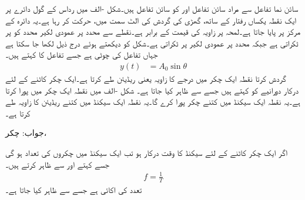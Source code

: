 
سائن نما تفاعل سے مراد سائن تفاعل  اور کو سائن تفاعل  ہیں۔شکل -الف میں رداس  کے گول دائرے پر ایک نقطہ یکساں رفتار کے ساتھ، گھڑی کی گردش کی الٹ سمت میں، حرکت کر رہا ہے۔یہ دائرہ  کے مرکز  پر پایا جاتا ہے۔لمحہ  پر زاویہ  کی قیمت  کے برابر ہے۔نقطے سے  محدد پر عمودی لکیر محدد کو    پر ٹکراتی ہے جبکہ  محدد پر عمودی لکیر  پر ٹکراتی ہے۔شکل کو دیکھتے ہوئے درج ذیل لکھا جا سکتا ہے جہاں  تفاعل کی چوٹی ہے جسے تفاعل کا  کہتے ہیں۔
\begin{align}\label{مساوات_بدلتا_سائن_نما_تفاعل_الف}
y(t)&=A_0 \sin \theta
\end{align}
 گردش کرتا نقطہ ایک چکر میں  درجے کا زاویہ یعنی  ریڈیئن طے کرتا ہے۔ایک چکر کاٹنے کے لئے درکار دورانیے کو  کہتے ہیں جسے  سے ظاہر کیا جاتا ہے۔
شکل -الف میں نقطہ ایک چکر  میں پورا کرتا ہے۔یہ نقطہ ایک سیکنڈ میں کتنے چکر پورا کرے گا۔یہ نقطہ ایک سیکنڈ میں کتنے ریڈیئن کا زاویہ طے کرتا ہے۔

جواب: چکر، 

اگر ایک چکر کاٹنے کے لئے  سیکنڈ کا وقت درکار ہو تب ایک سیکنڈ میں چکروں کی تعداد   ہو گی جسے  کہتے اور  سے ظاہر کرتے ہیں۔
\begin{align}
f=\frac{1}{T}
\end{align}
تعدد کی اکائی  ہے جسے  سے ظاہر کیا جاتا ہے۔

